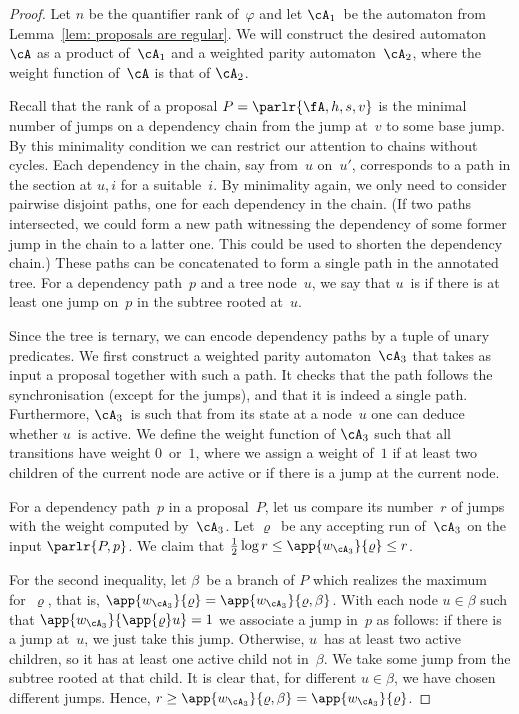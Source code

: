 \documentclass{LMCS}
\begin{document}
\begin{proof}
Let $n$ be the quantifier rank of~$\varphi$
and let $\cA_1$~be the automaton from Lemma~\ref{lem: proposals are regular}.
We will construct the desired automaton~$\cA$
as a product of~$\cA_1$ and a weighted parity automaton~$\cA_2$,
where the weight function of~$\cA$ is that of $\cA_2$.

Recall that the rank of a proposal $P=\parlr{\fA,h,s,v}$
is the minimal number of jumps
on a dependency chain from the jump at~$v$ to some base jump.
By this minimality condition
we can restrict our attention to chains without cycles.
Each dependency in the chain, say from~$u$ on~$u'$,
corresponds to a path in the section at $u,i$ for a suitable~$i$.
By minimality again, we only need to consider
pairwise disjoint paths, one for each dependency in the chain.
(If two paths intersected, we could form a new path witnessing the dependency
of some former jump in the chain to a latter one. This could be used to shorten
the dependency chain.)
These paths can be concatenated to form a single path in the annotated tree.
For a dependency path~$p$ and a tree node~$u$,
we say that $u$~is 
if there is at least one jump on~$p$ in the subtree rooted at~$u$.

Since the tree is ternary, we can encode dependency paths by a tuple of unary predicates.
We first construct a weighted parity automaton~$\cA_3$ that takes as input
a proposal together with such a path.
It checks that the path follows the synchronisation (except for the jumps),
and that it is indeed a single path.
Furthermore, $\cA_3$~is such that from its state at a node~$u$
one can deduce whether $u$~is active.
We define the weight function of $\cA_3$ such
that all transitions have weight $0$~or~$1$, where we assign
a weight of~$1$ if at least two children of the current node are active
or if there is a jump at the current node.

For a dependency path~$p$ in a proposal~$P$,
let us compare its number~$r$ of jumps
with the weight computed by~$\cA_3$.
Let $\varrho$~be any accepting run of~$\cA_3$
on the input $\parlr{P,p}$.
We claim that $\frac12\log r\leq\app{w_{\cA_3}}{\varrho}\leq r$.

For the second inequality,
let $\beta$~be a branch of $P$ which realizes the maximum for~$\varrho$,
that is, $\app{w_{\cA_3}}{\varrho}=\app{w_{\cA_3}}{\varrho,\beta}$.
With each node $u\in\beta$ such that $\app{w_{\cA_3}}{\app{\varrho}u}=1$
we associate a jump in~$p$ as follows\?:
if there is a jump at~$u$, we just take this jump.
Otherwise, $u$~has at least two active children,
so it has at least one active child not in~$\beta$.
We take some jump from the subtree rooted at that child.
It is clear that, for different $u\in\beta$, we have chosen different jumps.
Hence, $r\geq\app{w_{\cA_3}}{\varrho,\beta}=\app{w_{\cA_3}}{\varrho}$.


\end{proof}
\end{document}

